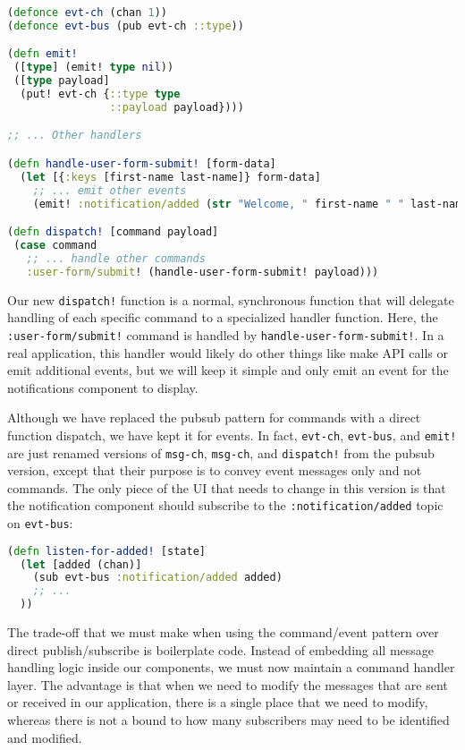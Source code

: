 \documentclass[10pt,twoside,openright]{memoir}
\begin{document}
\begin{lstlisting}[language=Clojure]
(defonce evt-ch (chan 1))
(defonce evt-bus (pub evt-ch ::type))

(defn emit!
 ([type] (emit! type nil))
 ([type payload]
  (put! evt-ch {::type type
                ::payload payload})))

;; ... Other handlers

(defn handle-user-form-submit! [form-data]
  (let [{:keys [first-name last-name]} form-data]
    ;; ... emit other events
    (emit! :notification/added (str "Welcome, " first-name " " last-name))))

(defn dispatch! [command payload]
 (case command
   ;; ... handle other commands
   :user-form/submit! (handle-user-form-submit! payload)))
\end{lstlisting}

Our new \texttt{dispatch!} function is a normal, synchronous function
that will delegate handling of each specific command to a specialized
handler function. Here, the \texttt{:user-form/submit!} command is
handled by \texttt{handle-user-form-submit!}. In a real application,
this handler would likely do other things like make API calls or emit
additional events, but we will keep it simple and only emit an event for
the notifications component to display.

Although we have replaced the pubsub pattern for commands with a direct
function dispatch, we have kept it for events. In fact, \texttt{evt-ch},
\texttt{evt-bus}, and \texttt{emit!} are just renamed versions of
\texttt{msg-ch}, \texttt{msg-ch}, and \texttt{dispatch!} from the pubsub
version, except that their purpose is to convey event messages only and
not commands. The only piece of the UI that needs to change in this
version is that the notification component should subscribe to the
\texttt{:notification/added} topic on \texttt{evt-bus}:

\begin{lstlisting}[language=Clojure]
(defn listen-for-added! [state]
  (let [added (chan)]
    (sub evt-bus :notification/added added)
    ;; ...
  ))
\end{lstlisting}

The trade-off that we must make when using the command/event pattern
over direct publish/subscribe is boilerplate code. Instead of embedding
all message handling logic inside our components, we must now maintain a
command handler layer. The advantage is that when we need to modify the
messages that are sent or received in our application, there is a single
place that we need to modify, whereas there is not a bound to how many
subscribers may need to be identified and modified.
\end{document}
